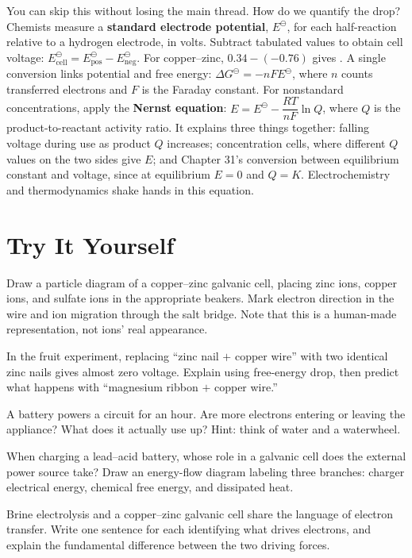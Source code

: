 \begin{tiaozhan}
You can skip this without losing the main thread. How do we quantify the drop? Chemists measure a \textbf{standard electrode potential}, $E^{\ominus}$, for each half-reaction relative to a hydrogen electrode, in volts. Subtract tabulated values to obtain cell voltage: $E^{\ominus}_{\text{cell}} = E^{\ominus}_{\text{pos}} - E^{\ominus}_{\text{neg}}$. For copper--zinc, $0.34-(-0.76)$ gives . A single conversion links potential and free energy: $\Delta G^{\ominus}=-nFE^{\ominus}$, where $n$ counts transferred electrons and $F$ is the Faraday constant. For nonstandard concentrations, apply the \textbf{Nernst equation}: $E = E^{\ominus} - \dfrac{RT}{nF}\ln Q$, where $Q$ is the product-to-reactant activity ratio. It explains three things together: falling voltage during use as product $Q$ increases; concentration cells, where different $Q$ values on the two sides give $E$; and Chapter 31's conversion between equilibrium constant and voltage, since at equilibrium $E=0$ and $Q=K$. Electrochemistry and thermodynamics shake hands in this equation.
\end{tiaozhan}

\section*{Try It Yourself}

\begin{sikaoti}
\item Draw a particle diagram of a copper--zinc galvanic cell, placing zinc ions, copper ions, and sulfate ions in the appropriate beakers. Mark electron direction in the wire and ion migration through the salt bridge. Note that this is a human-made representation, not ions' real appearance.
\item In the fruit experiment, replacing ``zinc nail $+$ copper wire'' with two identical zinc nails gives almost zero voltage. Explain using free-energy drop, then predict what happens with ``magnesium ribbon $+$ copper wire.''
\item A battery powers a circuit for an hour. Are more electrons entering or leaving the appliance? What does it actually use up? Hint: think of water and a waterwheel.
\item When charging a lead--acid battery, whose role in a galvanic cell does the external power source take? Draw an energy-flow diagram labeling three branches: charger electrical energy, chemical free energy, and dissipated heat.
\item Brine electrolysis and a copper--zinc galvanic cell share the language of electron transfer. Write one sentence for each identifying what drives electrons, and explain the fundamental difference between the two driving forces.
\end{sikaoti}
